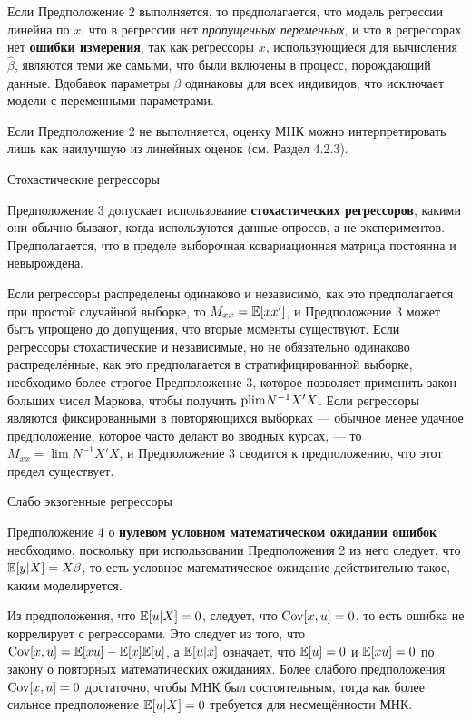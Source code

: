 Если Предположение 2 выполняется, то предполагается, что модель регрессии линейна по $x$, что в регрессии нет \textit{пропущенных переменных}, и что в регрессорах нет \textbf{ошибки измерения}, так как регрессоры $x$, использующиеся для вычисления $\hat{\beta}$, являются теми же самыми, что были включены в процесс, порождающий данные. Вдобавок параметры $\beta$ одинаковы для всех индивидов, что исключает модели с переменными параметрами. 

Если Предположение 2 не выполняется, оценку МНК можно интерпретировать лишь как наилучшую из линейных оценок (см. Раздел 4.2.3).

\begin{center}
 Стохастические регрессоры
 \end{center} 
 
Предположение 3 допускает использование \textbf{стохастических регрессоров}, какими они обычно бывают, когда используются данные опросов, а не экспериментов. Предполагается, что в пределе выборочная ковариационная матрица постоянна и невырождена.

Если регрессоры распределены одинаково и независимо, как это предполагается при простой случайной выборке, то $M_{xx}=\mathbb{E}[xx']$, и Предположение 3 может быть упрощено до допущения, что вторые моменты существуют. Если регрессоры стохастические и независимые, но не обязательно одинаково распределённые, как это предполагается в стратифицированной выборке, необходимо более строгое Предположение 3, которое позволяет применить закон больших чисел Маркова, чтобы получить $\mathrm{plim } N^{-1}X'X$. Если регрессоры являются фиксированными в повторяющихся выборках --- обычное менее удачное предположение, которое часто делают во вводных курсах, --- то $M_{xx} = \lim N^{-1}X'X$, и Предположение 3 сводится к предположению, что этот предел существует.
 
 
\begin{center}
 Слабо экзогенные регрессоры
 \end{center} 
 
Предположение 4 о \textbf{нулевом условном математическом ожидании ошибок} необходимо, поскольку при использовании Предположения 2 из него следует, что $\mathbb{E}[y|X] = X\beta$, то есть условное математическое ожидание действительно такое, каким моделируется.

Из предположения, что $\mathbb{E}[u|X]=0$, следует, что $\mathrm{Cov}[x,u]=0$, то есть ошибка не коррелирует с регрессорами. Это следует из того, что $\mathrm{Cov}[x,u] = \mathbb{E}[xu]-\mathbb{E}[x]\mathbb{E}[u]$, а $\mathbb{E}[u|x]$ означает, что $\mathbb{E}[u]=0$ и $\mathbb{E}[xu]=0$ по закону о повторных математических ожиданиях. Более слабого предположения $\mathrm{Cov}[x,u]=0$ достаточно, чтобы МНК был состоятельным, тогда как более сильное предположение  $\mathbb{E}[u|X]=0$ требуется для несмещённости МНК.

